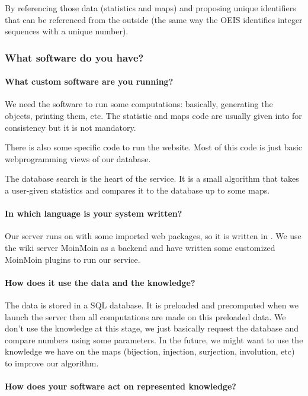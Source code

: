 By referencing those data (statistics and maps) and proposing unique identifiers that can be referenced from the outside (the same way the OEIS
identifies integer sequences with a unique number).

\subsubsection{What software do you have?}
 \paragraph{What custom software are you running?}

We need the software \SageMath to run some computations: basically, generating the objects, printing them, etc. The statistic and maps code are usually given into
\SageMath for consistency but it is not mandatory.

There is also some \FindStat specific code to run the website. Most of this code is just basic webprogramming views of our database.

The database search is the heart of the service. It is a small algorithm that takes a user-given statistics and compares it to the database up to some maps.

\paragraph{In which language is your system written?}

Our server runs on \SageMath with some imported web packages, so it is written in \python. We use the \python wiki server \textsf{MoinMoin} as a backend and have written some customized \textsf{MoinMoin} plugins to run our service.

 \paragraph{How does it use the data and the knowledge?}

The data is stored in a SQL database. It is preloaded and precomputed when we launch the server then all computations are made on this preloaded data. We don't use the knowledge at this stage, we just basically request the database and compare numbers using some parameters. In the future, we might want to  use the knowledge we have on the maps (bijection, injection, surjection, involution, etc) to improve our algorithm.

\paragraph{How does your software act on represented knowledge?}

